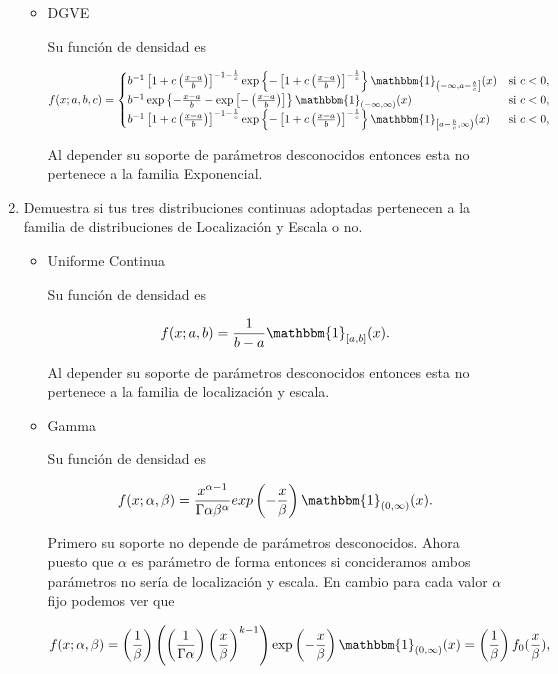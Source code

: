 \documentclass[letterpaper]{article}
\theoremstyle{definition}
\theoremstyle{lemathm}
\theoremstyle{lemathm}
\theoremstyle{lemathm}
\theoremstyle{lemademthm}
\newcommand{\pars}[1]{\left( #1 \right) }
\newcommand{\bracs}[1]{\left[ #1 \right] }
\newcommand{\set}[1]{\left \{ #1 \right\} }
\newcommand{\1}{\mathbbm{1}}
\begin{document}
\begin{enumerate}
\begin{itemize}
			\item DGVE
			
			Su función de densidad es 

			\[f(x; a,b,c) = \begin{cases}
				b^{-1}\bracs{1+c\pars{\frac{x-a}{b}}}^{-1-\frac{1}{c}}\exp\set{-\bracs{1+c\pars{\frac{x-a}{b}}}^{-\frac{1}{c}}}\1_{\left(-\infty,a-\frac{b}{c}\right]}(x) & \text{si } c < 0,\\
				b^{-1}\exp\set{-\frac{x-a}{b}-\exp\bracs{-\pars{\frac{x-a}{b}}}}\1_{\pars{-\infty,\infty}}(x) & \text{si } c < 0,\\
				b^{-1}\bracs{1+c\pars{\frac{x-a}{b}}}^{-1-\frac{1}{c}}\exp\set{-\bracs{1+c\pars{\frac{x-a}{b}}}^{-\frac{1}{c}}}\1_{\left[a-\frac{b}{c},\infty\right)}(x) & \text{si } c < 0,
			\end{cases}\]

			Al depender su soporte de parámetros desconocidos entonces esta no pertenece a la familia Exponencial.
		\end{itemize}

		\item Demuestra si tus tres distribuciones continuas adoptadas pertenecen a la familia de distribuciones de Localización y Escala o no.
		
		\begin{itemize}
			\item Uniforme Continua
			
			Su función de densidad es

			\[f(x; a,b) = \frac{1}{b-a} \1_{\bracs{a,b}}(x).\]

			Al depender su soporte de parámetros desconocidos entonces esta no pertenece a la familia de localización y escala.

			\item Gamma
			
			Su función de densidad es

			\[f(x;\alpha,\beta) = \frac{x^{\alpha-1}}{\Gamma{\alpha}\beta^{\alpha}} exp\pars{-\frac{x}{\beta}} \1_{(0,\infty)}(x).\]

			Primero su soporte no depende de parámetros desconocidos. Ahora puesto que $\alpha$ es parámetro de forma entonces si concideramos ambos parámetros no sería de localización y escala. En cambio para cada valor $\alpha$ fijo podemos ver que

			\[f(x;\alpha,\beta) = \pars{\frac{1}{\beta}}\pars{\pars{\frac{1}{\Gamma{\alpha}}}\pars{\frac{x}{\beta}}^{k-1}} \exp\pars{-\frac{x}{\beta}} \1_{(0,\infty)}(x) = \pars{\frac{1}{\beta}} f_0(\frac{x}{\beta}),\]


\end{itemize}
\end{enumerate}
\end{document}
